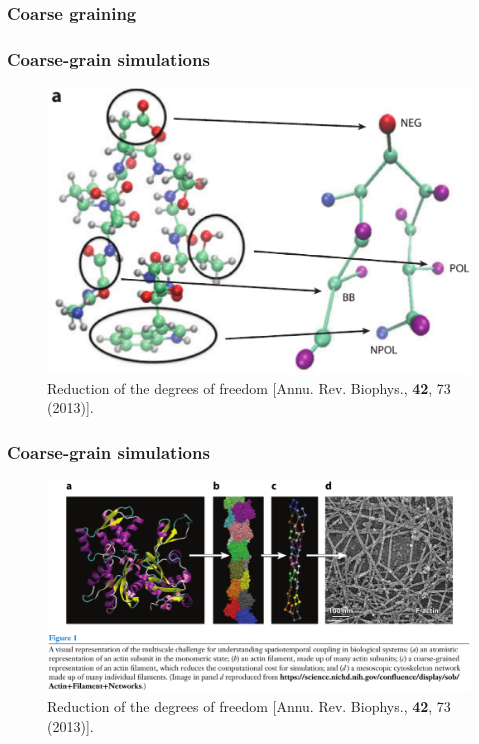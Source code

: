 \documentclass{beamer}
\begin{document}
\subsubsection{Coarse graining} 


\begin{frame}
\frametitle{Coarse-grain simulations}
\begin{figure}
\includegraphics[scale=0.3]{coarse-grain.eps}
\caption{{\scriptsize  Reduction of the degrees of freedom [Annu. Rev. Biophys., {\bf 42}, 73 (2013)]. }}
\end{figure}
\end{frame}

\begin{frame}
\frametitle{Coarse-grain simulations}
\begin{figure}
\includegraphics[scale=0.23]{coarse-grain-meso.eps}
\caption{{\scriptsize  Reduction of the degrees of freedom [Annu. Rev. Biophys., {\bf 42}, 73 (2013)]. }}
\end{figure}
\end{frame}
\end{document}
